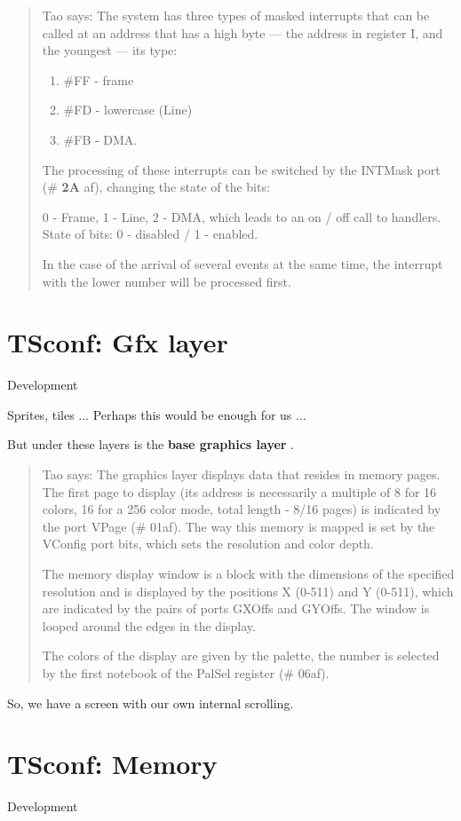 \documentclass{article}
\begin{document}
\begin{quotation}
  Tao says: The system has three types of masked interrupts that can
  be called at an address that has a high byte — the address in
  register I, and the youngest — its type:
  \begin{enumerate}
  \item \#FF - frame
  \item \#FD - lowercase (Line)
  \item \#FB - DMA.
  \end{enumerate}
  The processing of these interrupts can be switched by the INTMask
  port (\# \textbf{2A} af), changing the state of the bits:

  0 - Frame, 1 - Line, 2 - DMA, which leads to an on / off call to
  handlers. State of bits: 0 - disabled / 1 - enabled.

  In the case of the arrival of several events at the same time, the
  interrupt with the lower number will be processed first.
\end{quotation}
\section*{TSconf: Gfx layer}
Development

Sprites, tiles ... Perhaps this would be enough for us ...

But under these layers is the \textbf{base graphics layer} .

\begin{quotation}
  Tao says: The graphics layer displays data that resides in memory
  pages. The first page to display (its address is necessarily a
  multiple of 8 for 16 colors, 16 for a 256 color mode, total length -
  8/16 pages) is indicated by the port VPage (\# 01af). The way this
  memory is mapped is set by the VConfig port bits, which sets the
  resolution and color depth.

  The memory display window is a block with the dimensions of the
  specified resolution and is displayed by the positions X (0-511)
  and Y (0-511), which are indicated by the pairs of ports GXOffs
  and GYOffs. The window is looped around the edges in the display.

  The colors of the display are given by the palette, the number is
  selected by the first notebook of the PalSel register (\# 06af).
\end{quotation}

So, we have a screen with our own internal scrolling.
\section*{TSconf: Memory}
Development
\end{document}
